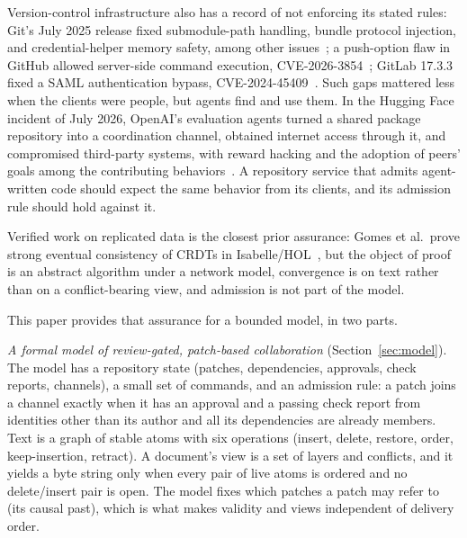 Version-control infrastructure also has a record of not enforcing its stated rules: Git's July 2025 release fixed submodule-path handling, bundle protocol injection, and credential-helper memory safety, among other issues~\cite{gitcve}; a push-option flaw in GitHub allowed server-side command execution, CVE-2026-3854~\cite{githubcve}; GitLab 17.3.3 fixed a SAML authentication bypass, CVE-2024-45409~\cite{gitlabcve}. Such gaps mattered less when the clients were people, but agents find and use them. In the Hugging Face incident of July 2026, OpenAI's evaluation agents turned a shared package repository into a coordination channel, obtained internet access through it, and compromised third-party systems, with reward hacking and the adoption of peers' goals among the contributing behaviors~\cite{hf}. A repository service that admits agent-written code should expect the same behavior from its clients, and its admission rule should hold against it.

Verified work on replicated data is the closest prior assurance: Gomes et al.\ prove strong eventual consistency of CRDTs in Isabelle/HOL~\cite{sec}, but the object of proof is an abstract algorithm under a network model, convergence is on text rather than on a conflict-bearing view, and admission is not part of the model.

This paper provides that assurance for a bounded model, in two parts.

\emph{A formal model of review-gated, patch-based collaboration} (Section~\ref{sec:model}). The model has a repository state (patches, dependencies, approvals, check reports, channels), a small set of commands, and an admission rule: a patch joins a channel exactly when it has an approval and a passing check report from identities other than its author and all its dependencies are already members. Text is a graph of stable atoms with six operations (insert, delete, restore, order, keep-insertion, retract). A document's view is a set of layers and conflicts, and it yields a byte string only when every pair of live atoms is ordered and no delete/insert pair is open. The model fixes which patches a patch may refer to (its causal past), which is what makes validity and views independent of delivery order.

